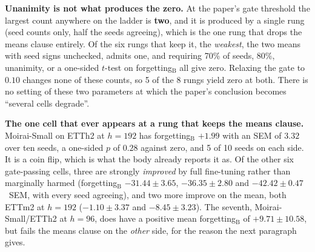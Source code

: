 \begin{table}[ht]
\centering\footnotesize
\caption{Degradation cells admitted under eight definitions and two gate
thresholds. Cells are named, not just counted. Under the fitted gate no cell is
admitted at $0.10$ alone, so the two columns agree throughout. The excluded confounded cells are
Chronos-T5-Small on ETTh1, ETTh2, ETTm2, Weather and Electricity. Emitted by
\texttt{scripts/degradation\_sensitivity.py}.}
\label{tab:defsensitivity}

\end{table}

\textbf{Unanimity is not what produces the zero.} At the paper's gate threshold
the largest count anywhere on the ladder is \textbf{two}, and it is produced by a
single rung (seed counts only, half the seeds agreeing), which is the one rung
that drops the means clause entirely. Of the six rungs that keep it, the
\emph{weakest}, the two means with seed signs unchecked, admits one, and requiring
70\% of seeds, 80\%, unanimity, or a one-sided $t$-test on forgetting$_\text{B}$
all give zero. Relaxing the gate to $0.10$ changes none of these counts, so 5 of
the 8 rungs yield zero at both. There is no setting of these two parameters at which the paper's
conclusion becomes ``several cells degrade''.

\textbf{The one cell that ever appears at a rung that keeps the means clause.}
Moirai-Small on ETTh2 at $h{=}192$ has
forgetting$_\text{B}$ $+1.99$ with an SEM of $3.32$ over ten seeds, a one-sided
$p$ of $0.28$ against zero, and 5 of 10 seeds on each side. It is a coin flip,
which is what the body already reports it as. Of the other six gate-passing
cells, three are strongly \emph{improved} by full fine-tuning rather than
marginally harmed (forgetting$_\text{B}$ $-31.44{\pm}3.65$, $-36.35{\pm}2.80$
and $-42.42{\pm}0.47$~SEM, with every seed agreeing), and two more improve on the
mean, both ETTm2 at $h{=}192$ ($-1.10{\pm}3.37$ and $-8.45{\pm}3.23$). The
seventh, Moirai-Small/ETTh2 at $h{=}96$, does have a positive mean
forgetting$_\text{B}$ of $+9.71{\pm}10.58$, but fails the means clause on the
\emph{other} side, for the reason the next paragraph gives.

